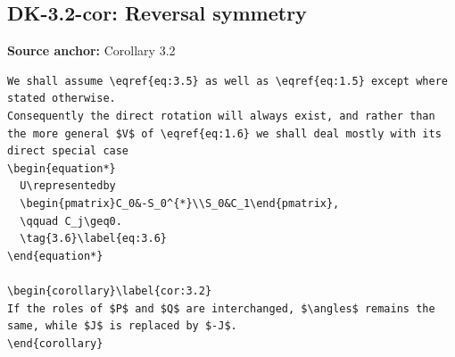 \subsection*{DK-3.2-cor: Reversal symmetry}
\noindent\textbf{Source anchor:} Corollary 3.2\\
\begin{verbatim}
We shall assume \eqref{eq:3.5} as well as \eqref{eq:1.5} except where stated otherwise.
Consequently the direct rotation will always exist, and rather than the more general $V$ of \eqref{eq:1.6} we shall deal mostly with its direct special case
\begin{equation*}
  U\representedby
  \begin{pmatrix}C_0&-S_0^{*}\\S_0&C_1\end{pmatrix},
  \qquad C_j\geq0.
  \tag{3.6}\label{eq:3.6}
\end{equation*}

\begin{corollary}\label{cor:3.2}
If the roles of $P$ and $Q$ are interchanged, $\angles$ remains the same, while $J$ is replaced by $-J$.
\end{corollary}
\end{verbatim}

